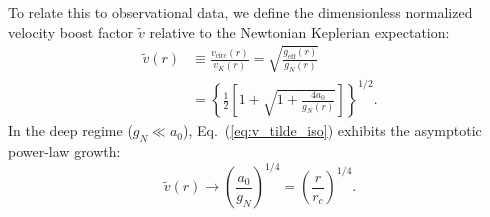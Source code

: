 \documentclass[aps,prd,reprint,superscriptaddress,nofootinbib,floatfix,amsmath,amssymb]{revtex4-2}
\begin{document}
To relate this to observational data, we define the dimensionless normalized velocity boost factor $\tilde{v}$ relative to the Newtonian Keplerian expectation:
\begin{align}
\tilde{v}(r) &\equiv \frac{v_{\text{circ}}(r)}{v_K(r)} = \sqrt{\frac{g_{\text{eff}}(r)}{g_N(r)}} \nonumber \\
&= \left\{ \frac{1}{2} \left[ 1 + \sqrt{1 + \frac{4 a_0}{g_N(r)}} \right] \right\}^{1/2}.
\label{eq:v_tilde_iso}
\end{align}
In the deep regime ($g_N \ll a_0$), Eq.~(\ref{eq:v_tilde_iso}) exhibits the asymptotic power-law growth:
\begin{equation}
\tilde{v}(r) \to \left(\frac{a_0}{g_N}\right)^{1/4} = \left(\frac{r}{r_c}\right)^{1/4}.
\label{eq:boost_unshielded}
\end{equation}
\end{document}
